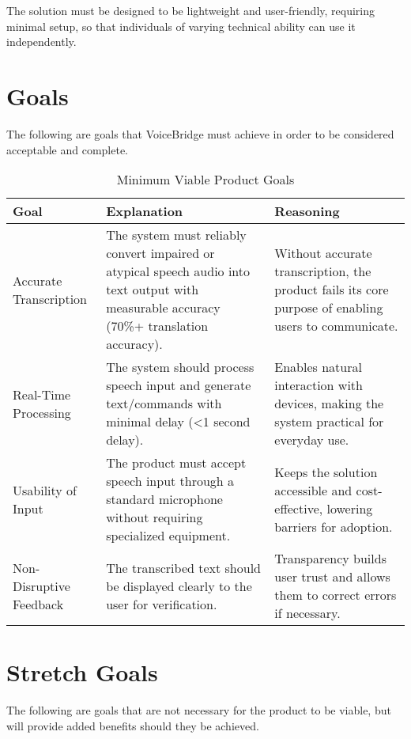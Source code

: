 \documentclass{article}
\begin{document}
The solution must be designed to be lightweight and user-friendly, requiring minimal setup, so that individuals of varying technical ability can use it independently.


\section{Goals}
The following are goals that VoiceBridge must achieve in order to be considered acceptable and complete.

\begin{table}[hp]
\caption{Minimum Viable Product Goals} 
\begin{tabularx}{\textwidth}{lXX} \\[-8pt]
\toprule
\textbf{Goal} & \textbf{Explanation} & \textbf{Reasoning}\\
\midrule
Accurate Transcription & The system must reliably convert impaired or atypical speech audio into text output with measurable accuracy (70\%+ translation accuracy). & Without accurate transcription, the product fails its core purpose of enabling users to communicate.\\
Real-Time Processing & The system should process speech input and generate text/commands with minimal delay (\textless1 second delay). & Enables natural interaction with devices, making the system practical for everyday use.\\
Usability of Input & The product must accept speech input through a standard microphone without requiring specialized equipment. & Keeps the solution accessible and cost-effective, lowering barriers for adoption.\\
Non-Disruptive Feedback & The transcribed text should be displayed clearly to the user for verification. & Transparency builds user trust and allows them to correct errors if necessary.\\
\bottomrule
\end{tabularx}
\end{table}

\section{Stretch Goals}
The following are goals that are not necessary for the product to be viable, but will provide added benefits should they be achieved.
\end{document}
